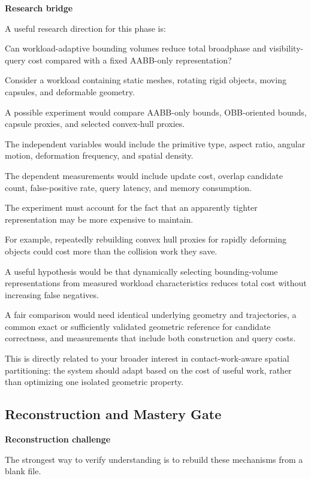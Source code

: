 \textbf{Research bridge}

A useful research direction for this phase is:

Can workload-adaptive bounding volumes reduce total broadphase and visibility-query cost compared with a fixed AABB-only representation?

Consider a workload containing static meshes, rotating rigid objects, moving capsules, and deformable geometry.

A possible experiment would compare AABB-only bounds, OBB-oriented bounds, capsule proxies, and selected convex-hull proxies.

The independent variables would include the primitive type, aspect ratio, angular motion, deformation frequency, and spatial density.

The dependent measurements would include update cost, overlap candidate count, false-positive rate, query latency, and memory consumption.

The experiment must account for the fact that an apparently tighter representation may be more expensive to maintain.

For example, repeatedly rebuilding convex hull proxies for rapidly deforming objects could cost more than the collision work they save.

A useful hypothesis would be that dynamically selecting bounding-volume representations from measured workload characteristics reduces total cost without increasing false negatives.

A fair comparison would need identical underlying geometry and trajectories, a common exact or sufficiently validated geometric reference for candidate correctness, and measurements that include both construction and query costs.

This is directly related to your broader interest in contact-work-aware spatial partitioning: the system should adapt based on the cost of useful work, rather than optimizing one isolated geometric property.

\subsection{Reconstruction and Mastery Gate}\label{04-visual-computing-ii-ch022-reconstruction-and-mastery-gate}

\textbf{Reconstruction challenge}

The strongest way to verify understanding is to rebuild these mechanisms from a blank file.

